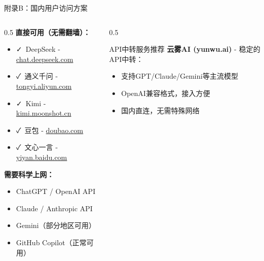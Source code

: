 \documentclass[aspectratio=169,11pt]{beamer}
\begin{document}
\begin{frame}{附录B：国内用户访问方案}
    \begin{columns}
        \begin{column}{0.5\textwidth}
            \textbf{直接可用（无需翻墙）：}
            \begin{itemize}
                \item \textcolor{green!60!black}{\faCheck\ DeepSeek} - \url{chat.deepseek.com}
                \item \textcolor{green!60!black}{\faCheck\ 通义千问} - \url{tongyi.aliyun.com}
                \item \textcolor{green!60!black}{\faCheck\ Kimi} - \url{kimi.moonshot.cn}
                \item \textcolor{green!60!black}{\faCheck\ 豆包} - \url{doubao.com}
                \item \textcolor{green!60!black}{\faCheck\ 文心一言} - \url{yiyan.baidu.com}
            \end{itemize}
            
            \vspace{0.3cm}
            \textbf{需要科学上网：}
            \begin{itemize}
                \item ChatGPT / OpenAI API
                \item Claude / Anthropic API
                \item Gemini（部分地区可用）
                \item GitHub Copilot（正常可用）
            \end{itemize}
        \end{column}
        \begin{column}{0.5\textwidth}
            \begin{block}{API中转服务推荐}
                \small
                \textbf{云雾AI (yunwu.ai)} - 稳定的API中转：
                \begin{itemize}
                    \item 支持GPT/Claude/Gemini等主流模型
                    \item OpenAI兼容格式，接入方便
                    \item 国内直连，无需特殊网络
                \end{itemize}
            \end{block}
            

\end{column}
\end{columns}
\end{frame}
\end{document}
